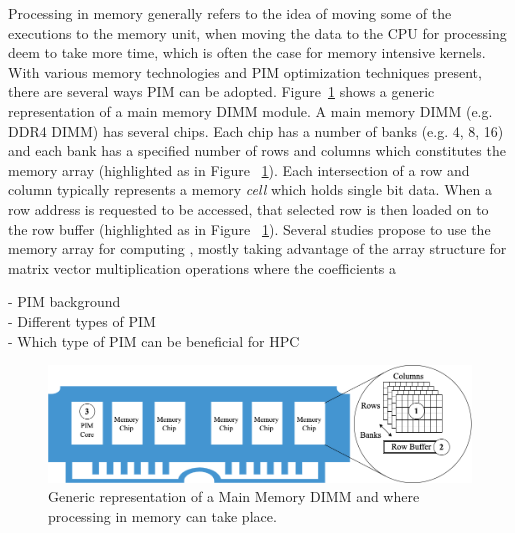 Processing in memory generally refers to the idea of moving some of the executions to the memory unit, when moving the data to the CPU for processing deem to take more time, which is often the case for memory intensive kernels. With various memory technologies and PIM optimization techniques present, there are several ways PIM can be adopted. Figure~\ref{fig:pimcat} shows a generic representation of a main memory DIMM module. A main memory DIMM (e.g. DDR4 DIMM) has several chips. Each chip has a number of banks (e.g. 4, 8, 16) and each bank has a specified number of rows and columns which constitutes the memory array (highlighted as  in Figure ~\ref{fig:pimcat}). Each intersection of a row and column typically represents a memory \textit{cell} which holds single bit data. When a row address is requested to be accessed, that selected row is then loaded on to the row buffer (highlighted as  in Figure ~\ref{fig:pimcat}). Several studies propose to use the memory array  for computing \cite{03,06,13,15,20,29,54,55,58}, mostly taking advantage of the array structure for matrix vector multiplication operations where the coefficients a   







-	PIM background \\
-	Different types of PIM \\
-	Which type of PIM can be beneficial for HPC \\


\begin{figure}[t!]
\centering
\includegraphics[width=\columnwidth]{MEMSYS22/figures/pimcat.png}
\caption{Generic representation of a Main Memory DIMM and where processing in memory can take place.}
\label{fig:pimcat}
\end{figure}   


  